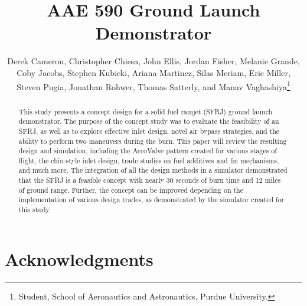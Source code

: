 \documentclass[conf]{new-aiaa}
\title{AAE 590 Ground Launch Demonstrator}
\author{Derek Cameron, Christopher Chiesa, John Ellis, Jordan Fisher, Melanie Grande, Coby Jacobs, Stephen Kubicki, Ariana Martinez, Silas Meriam, Eric Miller, Steven Pugia, Jonathan Rohwer, Thomas Satterly, and Manav Vaghashiya​\footnote{Student, School of Aeronautics and Astronautics, Purdue University.}}
\affil{Purdue University, West Lafayette, Indiana, 47906}
\begin{document}
\setcounter{secnumdepth}{3}
\maketitle
\begin{abstract}
This study presents a concept design for a solid fuel ramjet (SFRJ) ground launch demonstrator. The purpose of the concept study was to evaluate the feasibility of an SFRJ, as well as to explore effective inlet design, novel air bypass strategies, and the ability to perform two maneuvers during the burn. This paper will review the resulting design and simulation, including the AeroValve pattern created for various stages of flight, the chin-style inlet design, trade studies on fuel additives and fin mechanisms, and much more. The integration of all the design methods in a simulator demonstrated that the SFRJ is a feasible concept with nearly 30 seconds of burn time and 12 miles of ground range. Further, the concept can be improved depending on the implementation of various design trades, as demonstrated by the simulator created for this study. 
\end{abstract}

\tableofcontents























\section{Acknowledgments}


\end{document}
